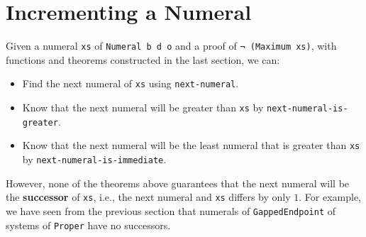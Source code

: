 \documentclass[\main/thesis.tex]{subfiles}
\begin{document}
\section{Incrementing a Numeral}\label{increment}

Given a numeral \lstinline|xs| of \lstinline|Numeral b d o|
and a proof of \lstinline|¬ (Maximum xs)|,
with functions and theorems constructed in the last section, we can:

\begin{itemize}
    \item Find the next numeral of \lstinline|xs| using \lstinline|next-numeral|.
    \item Know that the next numeral will be greater than \lstinline|xs|
        by \lstinline|next-numeral-is-greater|.
    \item Know that the next numeral will be the least numeral that is greater
        than \lstinline|xs| by \lstinline|next-numeral-is-immediate|.
\end{itemize}

However, none of the theorems above guarantees that the next numeral will be the
\textbf{successor} of \lstinline|xs|, i.e., the next numeral and \lstinline|xs|
differs by only $ 1 $.
For example, we have seen from the previous section that numerals of
\lstinline|GappedEndpoint| of systems of \lstinline|Proper| have no successors.
\end{document}
